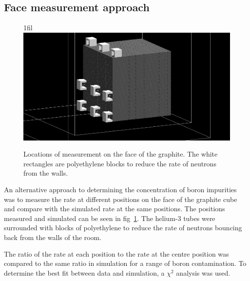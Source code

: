 \documentclass{article}
\makeatletter
\newcommand*{\centerfloat}{%
  \parindent \z@
  \leftskip \z@ \@plus 1fil \@minus \textwidth
  \rightskip\leftskip
  \parfillskip \z@skip}
\makeatother
\begin{document}
\subsection{Face measurement approach}


\begin{figure}
	\centerfloat
	\includegraphics[width=\columnwidth]{images/FaceApproach}
	\caption{Locations of measurement on the face of the graphite. The white rectangles are polyethylene blocks to reduce the rate of neutrons from the walls.}	
	\label{fig:FaceImage}
\end{figure}

An alternative approach to determining the concentration of boron impurities was to measure the rate at different positions on the face of the graphite cube and compare with the simulated rate at the same positions. The positions measured and simulated can be seen in fig~\ref{fig:FaceImage}. The helium-3 tubes were surrounded with blocks of polyethylene to reduce the rate of neutrons bouncing back from the walls of the room.


The ratio of the rate at each position to the rate at the centre position was compared to the same ratio in simulation for a range of boron contamination. To determine the best fit between data and simulation, a $\chi^2$ analysis was used.






\clearpage
	
	
\end{document}
